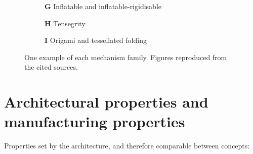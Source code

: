 \begin{figure}[htbp]
    \begin{subfigure}[t]{0.31\textwidth}
        \centering
        \famstub %
        \caption{\textbf{G} Inflatable and inflatable-rigidisable \cite{freeland_large_1997}}
        \label{fig:family-g}
    \end{subfigure}
    \hfill
    \begin{subfigure}[t]{0.31\textwidth}
        \centering
        \famstub %
        \caption{\textbf{H} Tensegrity \cite{tibert_deployable_2002}}
        \label{fig:family-h}
    \end{subfigure}
    \hfill
    \begin{subfigure}[t]{0.31\textwidth}
        \centering
        \famstub %
        \caption{\textbf{I} Origami and tessellated folding \cite{XXX_origami}}
        \label{fig:family-i}
    \end{subfigure}

    \caption{One example of each mechanism family. Figures reproduced from the cited sources.}
    \label{fig:families}
\end{figure}

\section{Architectural properties and manufacturing properties}
\label{sec:properties}

Properties set by the architecture, and therefore comparable between concepts:

